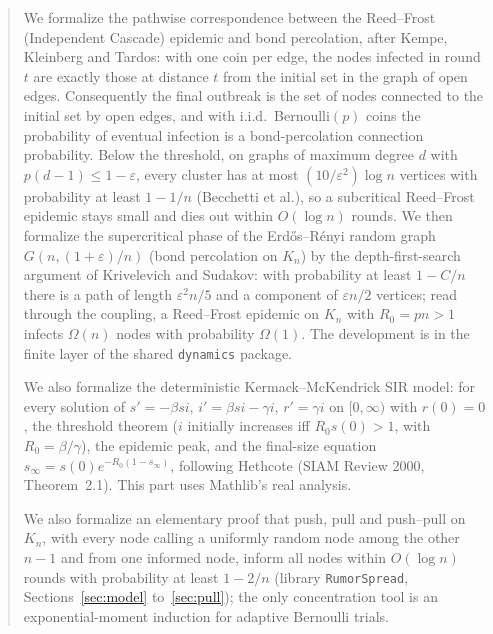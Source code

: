 
\begin{abstract}
We formalize the pathwise correspondence between the Reed--Frost (Independent Cascade) epidemic
and bond percolation, after Kempe, Kleinberg and Tardos: with one coin per edge, the nodes
infected in round $t$ are exactly those at distance $t$ from the initial set in the graph of
open edges. Consequently the final outbreak is the set of nodes connected to the initial set by
open edges, and with i.i.d.\ Bernoulli$(p)$ coins the probability of eventual infection is a
bond-percolation connection probability. Below the threshold, on graphs of maximum degree $d$ with
$p(d-1)\le1-\varepsilon$, every cluster has at most $(10/\varepsilon^2)\log n$ vertices with
probability at least $1-1/n$ (Becchetti et al.), so a subcritical Reed--Frost epidemic stays
small and dies out within $O(\log n)$ rounds. We then formalize the supercritical phase of the
Erd\H{o}s--R\'enyi random graph $G(n,(1+\varepsilon)/n)$ (bond percolation on $K_n$) by the
depth-first-search argument of Krivelevich and Sudakov: with probability at least $1-C/n$ there is
a path of length $\varepsilon^2 n/5$ and a component of $\varepsilon n/2$ vertices; read through
the coupling, a Reed--Frost epidemic on $K_n$ with $R_0=pn>1$ infects $\Omega(n)$ nodes with
probability $\Omega(1)$. The development is in the finite layer of the shared \texttt{dynamics}
package.

We also formalize the deterministic Kermack--McKendrick SIR model: for every solution of
$s'=-\beta si$, $i'=\beta si-\gamma i$, $r'=\gamma i$ on $[0,\infty)$ with $r(0)=0$, the threshold
theorem ($i$ initially increases iff $R_0s(0)>1$, with $R_0=\beta/\gamma$), the epidemic peak, and
the final-size equation $s_\infty=s(0)e^{-R_0(1-s_\infty)}$, following Hethcote (SIAM Review
2000, Theorem~2.1). This part uses Mathlib's real analysis.

We also formalize an elementary proof that push, pull and push--pull on $K_n$, with every node
calling a uniformly random node among the other $n-1$ and from one informed node, inform all
nodes within $O(\log n)$ rounds with probability at least $1-2/n$ (library \texttt{RumorSpread},
Sections~\ref{sec:model} to~\ref{sec:pull}); the only concentration tool is an exponential-moment
induction for adaptive Bernoulli trials.


\end{abstract}
